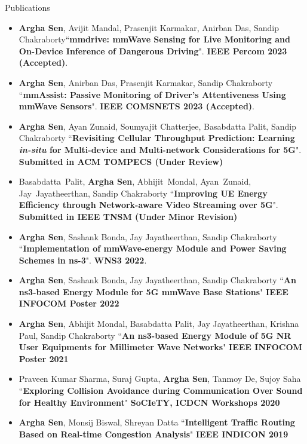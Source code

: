 \documentclass{resume} %
\begin{document}
	\begin{rSection}{Publications} 
		\begin{itemize}
			\small
			
			\item \textbf{Argha Sen}, Avijit Mandal, Prasenjit Karmakar, Anirban Das, Sandip Chakraborty``\textbf{mmdrive: mmWave Sensing for Live Monitoring and On-Device Inference of Dangerous Driving}". \textbf{IEEE Percom 2023 (Accepted)}.
			
			\item \textbf{Argha Sen}, Anirban Das, Prasenjit Karmakar, Sandip Chakraborty ``\textbf{mmAssist: Passive Monitoring of Driver's Attentiveness Using mmWave Sensors}". \textbf{IEEE COMSNETS 2023 (Accepted)}.
			
			\item \textbf{Argha Sen}, Ayan Zunaid, Soumyajit Chatterjee, Basabdatta Palit, Sandip Chakraborty ``\textbf{Revisiting Cellular Throughput Prediction: Learning \textit{in-situ} for Multi-device and Multi-network Considerations for 5G}". \textbf{Submitted in ACM TOMPECS (Under Review)}
			
			\item Basabdatta~Palit, \textbf{Argha Sen}, Abhijit~Mondal, Ayan~Zunaid, Jay~Jayatheerthan, Sandip Chakraborty ``\textbf{Improving UE Energy Efficiency through Network-aware Video Streaming over 5G}". \textbf{Submitted in IEEE TNSM (Under Minor Revision)}
			
			\item \textbf{Argha Sen}, Sashank Bonda, Jay Jayatheerthan, Sandip Chakraborty ``\textbf{Implementation of mmWave-energy Module and Power Saving Schemes in ns-3}". \textbf{WNS3 2022}.
			
			\item \textbf{Argha Sen}, Sashank Bonda, Jay Jayatheerthan, Sandip Chakraborty
			``\textbf{An ns3-based Energy Module for 5G mmWave Base Stations}" \textbf{IEEE INFOCOM Poster 2022}
			
			\item \textbf{Argha Sen}, Abhijit Mondal, Basabdatta Palit, Jay Jayatheerthan, Krishna Paul, Sandip Chakraborty ``\textbf{An ns3-based Energy Module of 5G NR User Equipments for Millimeter Wave Networks}" \textbf{IEEE INFOCOM Poster 2021}
			
			\item Praveen Kumar Sharma, Suraj Gupta, \textbf{Argha Sen}, Tanmoy De, Sujoy Saha ``\textbf{Exploring Collision Avoidance during Communication Over Sound for Healthy Environment}" \textbf{SoCIeTY, ICDCN Workshops 2020}
			
			\item \textbf{Argha Sen}, Monsij Biswal, Shreyan Datta ``\textbf{Intelligent Traffic Routing Based on Real-time Congestion Analysis}" \textbf{IEEE INDICON 2019} 
			
		\end{itemize}
	\end{rSection}
	
\end{document}
